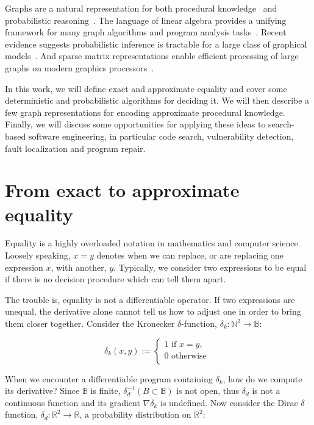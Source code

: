 \documentclass[11pt]{article}
\begin{document}
    Graphs are a natural representation for both procedural knowledge~\citep{allamanis2017learning} and probabilistic reasoning~\citep{pearl2014probabilistic}. The language of linear algebra provides a unifying framework for many graph algorithms and program analysis tasks~\citep{kepner2011graph}. Recent evidence suggests probabilistic inference is tractable for a large class of graphical models~\citep{choi2020probabilistic}. And sparse matrix representations enable efficient processing of large graphs on modern graphics processors~\citep{kepner2016mathematical}.

    In this work, we will define exact and approximate equality and cover some deterministic and probabilistic algorithms for deciding it. We will then describe a few graph representations for encoding approximate procedural knowledge. Finally, we will discuss some opportunities for applying these ideas to search-based software engineering, in particular code search, vulnerability detection, fault localization and program repair.


    \section{From exact to approximate equality}\label{sec:definitions}

    Equality is a highly overloaded notation in mathematics and computer science. Loosely speaking, $x = y$ denotes when we can replace, or are replacing one expression $x$, with another, $y$. Typically, we consider two expressions to be equal if there is no decision procedure which can tell them apart.

    The trouble is, equality is not a differentiable operator. If two expressions are unequal, the derivative alone cannot tell us how to adjust one in order to bring them closer together. Consider the Kronecker $\delta$-function, $\delta_k: \mathbb{N}^2\rightarrow \mathbb{B}$:

    $$
    \delta_k(x, y) :=
    \begin{cases}
        1 \text{ if } x = y, \\
        0 \text{ otherwise }\\
    \end{cases}
    $$

    When we encounter a differentiable program containing $\delta_k$, how do we compute its derivative? Since $\mathbb{B}$ is finite, $\delta_d^{-1}(B\subset \mathbb{B})$ is not open, thus $\delta_d$ is not a continuous function and its gradient $\nabla\delta_k$ is undefined. Now consider the Dirac $\delta$ function, $\delta_d: \mathbb{R}^2 \rightarrow \mathbb{R}$, a probability distribution on $\mathbb{R}^2$:
\end{document}
